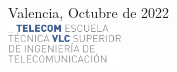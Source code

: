\begin{titlepage}

{\large %
Valencia, Octubre de 2022
}\\[1cm] %


\includegraphics[width=3cm]{logo}\\[1cm] %
 

\vfill %

\cleardoublepage
\thispagestyle{empty}
\end{titlepage}


\raggedbottom



%